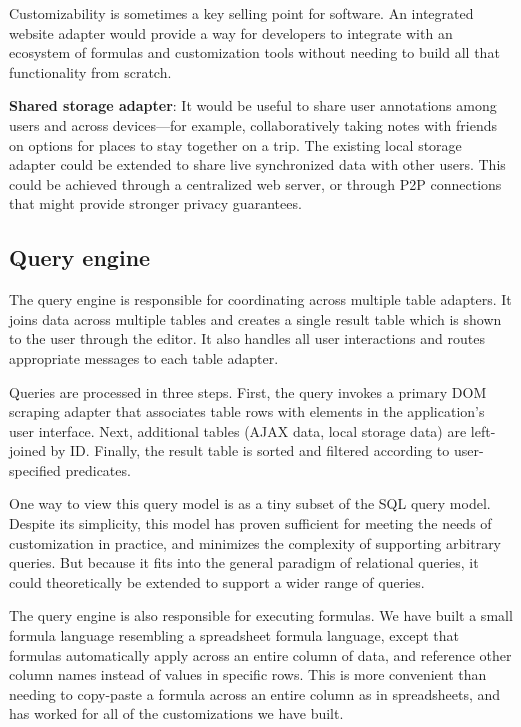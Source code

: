 \documentclass[sigplan,screen,10pt,anonymous,review]{acmart}
\begin{document}
Customizability is sometimes a key selling point for software. An
integrated website adapter would provide a way for developers to
integrate with an ecosystem of formulas and customization tools without
needing to build all that functionality from scratch.

\textbf{Shared storage adapter}: It would be useful to share user
annotations among users and across devices---for example,
collaboratively taking notes with friends on options for places to stay
together on a trip. The existing local storage adapter could be extended
to share live synchronized data with other users. This could be achieved
through a centralized web server, or through P2P connections that might
provide stronger privacy guarantees.

\hypertarget{query-engine}{%
\subsection{Query engine}\label{query-engine}}

The query engine is responsible for coordinating across multiple table
adapters. It joins data across multiple tables and creates a single
result table which is shown to the user through the editor. It also
handles all user interactions and routes appropriate messages to each
table adapter.

Queries are processed in three steps. First, the query invokes a primary
DOM scraping adapter that associates table rows with elements in the
application's user interface. Next, additional tables (AJAX data, local
storage data) are left-joined by ID. Finally, the result table is sorted
and filtered according to user-specified predicates.

One way to view this query model is as a tiny subset of the SQL query
model. Despite its simplicity, this model has proven sufficient for
meeting the needs of customization in practice, and minimizes the
complexity of supporting arbitrary queries. But because it fits into the
general paradigm of relational queries, it could theoretically be
extended to support a wider range of queries.

The query engine is also responsible for executing formulas. We have
built a small formula language resembling a spreadsheet formula
language, except that formulas automatically apply across an entire
column of data, and reference other column names instead of values in
specific rows. This is more convenient than needing to copy-paste a
formula across an entire column as in spreadsheets, and has worked for
all of the customizations we have built.
\end{document}
